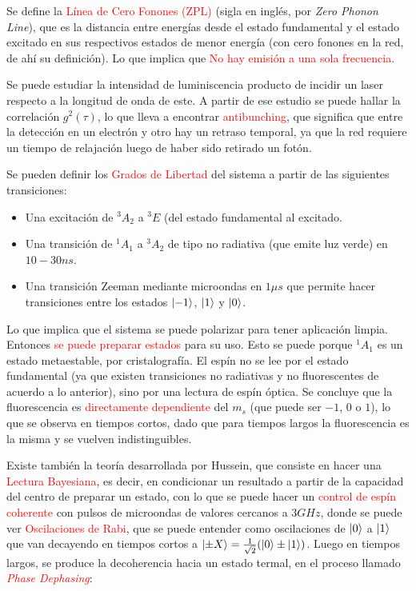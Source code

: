 \documentclass{book}
\begin{document}
Se define la \textcolor{red}{Línea de Cero Fonones (ZPL)} (sigla en inglés, por \textit{Zero Phonon Line}), que es la distancia entre energías desde el estado fundamental y el estado excitado en sus respectivos estados de menor energía (con cero fonones en la red, de ahí su definición). Lo que implica que \textcolor{red}{No hay emisión a una sola frecuencia}.

Se puede estudiar la intensidad de  luminiscencia producto de incidir un laser respecto a la longitud de onda de este. A partir de ese estudio se puede hallar la correlación $g^2(\tau)$, lo que lleva a encontrar \textcolor{red}{antibunching}, que significa que entre la detección en un electrón y otro hay un retraso temporal, ya que la red requiere un tiempo de relajación luego de haber sido retirado un fotón.

Se pueden definir los \textcolor{red}{Grados de Libertad} del sistema a partir de las siguientes transiciones:
\begin{itemize}
    \item Una  excitación de ${}^3A_2$ a ${}^3E$  (del estado fundamental al excitado.
    \item Una transición de ${}^1A_1$ a ${}^3A_2$ de tipo no radiativa (que emite luz verde) en $10-30 ns$.
    \item Una transición Zeeman mediante microondas en $1\mu s$ que permite hacer transiciones entre los estados $\ket{-1}$, $\ket{1} $ y $\ket{0}$.
\end{itemize}

Lo que implica que el sistema se puede polarizar para tener aplicación limpia. Entonces \textcolor{red}{se puede preparar estados} para su uso. Esto se puede porque ${}^1A_1$ es un estado metaestable, por cristalografía. El espín no se lee por el estado fundamental (ya que existen transiciones no radiativas y no fluorescentes de acuerdo a lo anterior), sino por una lectura de espín óptica. Se concluye que la fluorescencia es \textcolor{red}{directamente dependiente} del $m_s$ (que puede ser $-1$, $0$ o $1$), lo que se observa en tiempos cortos, dado que para tiempos largos la fluorescencia es la misma y se vuelven indistinguibles.

Existe también la teoría desarrollada por Hussein, que consiste en hacer una \textcolor{red}{Lectura Bayesiana}, es decir, en condicionar un resultado a partir de la capacidad del centro de preparar un estado, con lo que se puede hacer un \textcolor{red}{control de espín coherente} con pulsos de microondas de valores cercanos a $3 GHz$, donde se puede ver \textcolor{red}{Oscilaciones de Rabi}, que se puede entender como oscilaciones de $\ket{0}$ a $\ket{1}$ que van decayendo en tiempos cortos a $\ket{\pm X}=\frac{1}{\sqrt{2}}(\ket{0}\pm\ket{1})$. Luego en tiempos largos, se produce la decoherencia hacia un estado termal, en el proceso llamado \textit{\textcolor{red}{Phase Dephasing}}:
\end{document}

